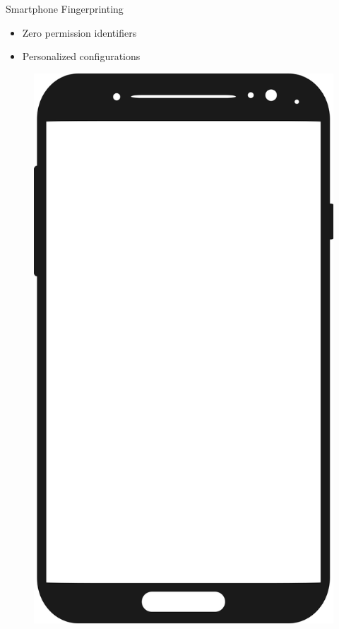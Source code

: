 \documentclass[aspectratio=169]{beamer}
[aspectratio=169] %
\begin{document}
\begin{frame}{Smartphone Fingerprinting}
  \begin{minipage}{0.49\textwidth} 
    \begin{itemize}
      \item Zero permission identifiers
      \item Personalized configurations
    \end{itemize}
  \end{minipage}
  \hfill
  \begin{minipage}{0.49\textwidth} 
    \begin{figure}
      \centering
      \includegraphics[height=0.5\textheight]{figures/smartphone.png}
    \end{figure}
  \end{minipage}
\end{frame}
\end{document}
